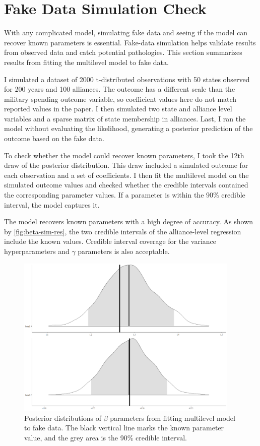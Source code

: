 \documentclass[12pt]{article}
\begin{document}
\section*{Fake Data Simulation Check}


With any complicated model, simulating fake data and seeing if the model can recover known parameters is essential. 
Fake-data simulation helps validate results from observed data and catch potential pathologies. 
This section summarizes results from fitting the multilevel model to fake data.


I simulated a dataset of 2000 t-distributed observations with 50 states observed for 200 years and 100 alliances. 
The outcome has a different scale than the military spending outcome variable, so coefficient values here do not match reported values in the paper.  
I then simulated two state and alliance level variables and a sparse matrix of state membership in alliances. 
Last, I ran the model without evaluating the likelihood, generating a posterior prediction of the outcome based on the fake data.


To check whether the model could recover known parameters, I took the 12th draw of the posterior distribution.
This draw included a simulated outcome for each observation and a set of coefficients. 
I then fit the multilevel model on the simulated outcome values and checked whether the credible intervals contained the corresponding parameter values. 
If a parameter is within the 90\% credible interval, the model captures it. 


The model recovers known parameters with a high degree of accuracy. 
As shown by \autoref{fig:beta-sim-res}, the two credible intervals of the alliance-level regression include the known values.
Credible interval coverage for the variance hyperparameters and $\gamma$ parameters is also acceptable. 


\begin{figure}[htbp]
	\centering
		\includegraphics[width=0.95\textwidth]{beta-sim-res.png}
	\caption{Posterior distributions of $\beta$ parameters from fitting multilevel model to fake data. The black vertical line marks the known parameter value, and the grey area is the 90\% credible interval.}
	\label{fig:beta-sim-res}
\end{figure}
\end{document}
